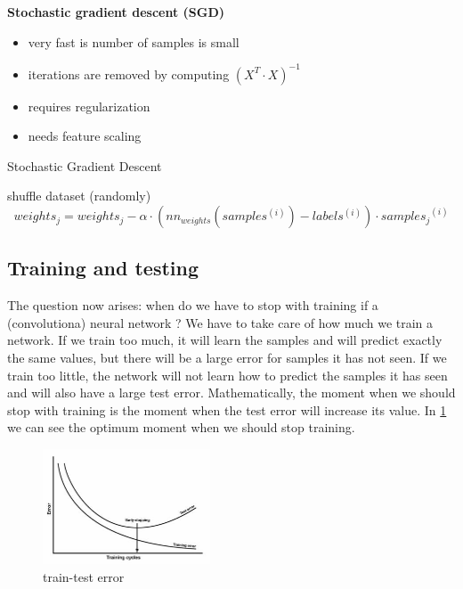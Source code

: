 \vspace{8mm}


\textbf{Stochastic gradient descent (SGD)}

\begin{itemize}
	\item{very fast is number of samples is small}
	\item{iterations are removed by computing $(X^T\cdot X)^{-1}$}
	\item{requires regularization}
	\item{needs feature scaling}
\end{itemize}

\begin{algorithm}
	\caption{Stochastic Gradient Descent\cite{ng}} \label{sgd-code}
	\begin{algorithmic}[1]
		\Repeat
			\State shuffle dataset (randomly)
       				\begin{equation}
					weights_j = weights_j - \alpha\cdot(nn_{weights}(samples^{(i)}) - labels^{(i)})\cdot {samples_j}^{(i)}
					\end{equation}
      			\EndFor
      		\EndFor
	\end{algorithmic}
\end{algorithm}

\newpage

\subsection{Training and testing}
\label{train-test}

The question now arises: when do we have to stop with training if a (convolutiona) neural network ?
We have to take care of how much we train a network. If we train too much, it will learn the samples and will predict exactly the same values, but there will be a large error for samples it has not seen. If we train too little, the network will not learn how to predict the samples it has seen and will also have a large test error.
Mathematically, the moment when we should stop with training is the moment when the test error will increase its value. In \ref{fig:traintest} we can see the optimum moment when we should stop training.

\begin{figure}[h]
	\begin{center}
		\includegraphics[width=188px,height=129px]{src/img/state/traintest}
		\caption{train-test error\cite{traintest}} \label{fig:traintest}
    \end{center}
\end{figure}

